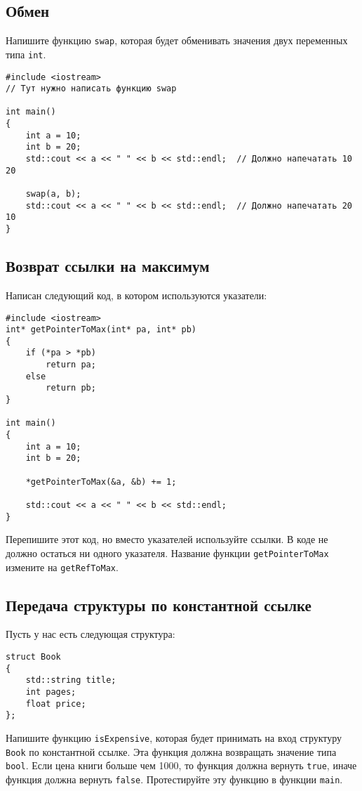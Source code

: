 \documentclass{article}
\begin{document}
\subsection{Обмен}
Напишите функцию \texttt{swap}, которая будет обменивать значения двух переменных типа \texttt{int}.
\begin{lstlisting}
#include <iostream>
// Тут нужно написать функцию swap

int main()
{
	int a = 10;
	int b = 20;
	std::cout << a << " " << b << std::endl;  // Должно напечатать 10 20
	
	swap(a, b);
	std::cout << a << " " << b << std::endl;  // Должно напечатать 20 10
}
\end{lstlisting}


\subsection{Возврат ссылки на максимум}
Написан следующий код, в котором используются указатели:
\begin{lstlisting}
#include <iostream>
int* getPointerToMax(int* pa, int* pb)
{
	if (*pa > *pb)
		return pa;
	else
		return pb;
}

int main()
{
	int a = 10;
	int b = 20;
	
	*getPointerToMax(&a, &b) += 1;
	
	std::cout << a << " " << b << std::endl;
}
\end{lstlisting}
Перепишите этот код, но вместо указателей используйте ссылки. В коде не должно остаться ни одного указателя. Название функции \texttt{getPointerToMax} измените на \texttt{getRefToMax}.

\iffalse
\subsection{Передача структуры по ссылке}
Пусть у нас есть следующая структура:
\begin{lstlisting}
struct Book
{
    std::string title;
    int pages;
    float price;
};
\end{lstlisting}
Напишите функцию \texttt{addPrice}, которая будет принимать на вход структуру \texttt{Book} по ссылке и некоторое число \texttt{x} типа \texttt{float}. Эта функция должна увеличивать цену переданной книги на \texttt{x}. Протестируйте эту функцию в функции \texttt{main}.
\fi

\subsection{Передача структуры по константной ссылке}
Пусть у нас есть следующая структура:
\begin{lstlisting}
struct Book
{
    std::string title;
    int pages;
    float price;
};
\end{lstlisting}
Напишите функцию \texttt{isExpensive}, которая будет принимать на вход структуру \texttt{Book} по константной ссылке. Эта функция должна возвращать значение типа \texttt{bool}. Если цена книги больше чем 1000, то функция должна вернуть \texttt{true}, иначе функция должна вернуть \texttt{false}. Протестируйте эту функцию в функции \texttt{main}.
\end{document}
